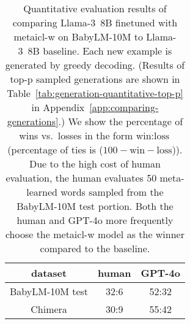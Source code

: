 \documentclass{article}
\begin{document}
\begin{table}[h]
\small
\begin{center}
\end{center}
\caption{Percentages of wins of each model when comparing the generations from \mbox{Llama-3 8B} baseline (pre-trained to instruction-tuned) with the \ac{metaicl-w} model finetuned from that baseline, judged by \mbox{GPT-4o}.
The left two datasets are for new usage example generation in Section~\ref{sec:example-generation}, and the right-most one is for definition generation in Section~\ref{sec:definition-generation}.
Each new example or definition is generated by top-p=$0.92$.
The percentage of ties is the remaining after subtracting the win percentages of the two models.
\mbox{GPT-4o} more frequently chooses the \ac{metaicl-w} model as the winner compared to the corresponding baseline, except for the instruction-tuned model on Chimera and CoLLEGe-DefGen.}
\label{tab:generative-quantitative-compare-top-p}
\end{table}


\iffalse

\begin{table}[t]
\small
\begin{center}
\begin{tabular}{c|cc}
\toprule
dataset         & human & GPT-4o \\
\midrule
BabyLM-10M test & 32:6  & 52:32 \\
Chimera         & 30:9  & 55:42 \\
\bottomrule
\end{tabular}
\end{center}
\caption{Quantitative evaluation results of comparing \mbox{Llama-3 8B} finetuned with \ac{metaicl-w} on BabyLM-10M to \mbox{Llama-3 8B} baseline. Each new example is generated by greedy decoding.
(Results of top-p sampled generations are shown in Table~\ref{tab:generation-quantitative-top-p} in Appendix~\ref{app:comparing-generations}.)
We show the percentage of wins vs.\ losses in the form $\text{win}:\text{loss}$ (percentage of ties is ($100-\text{win}-\text{loss}$)).
Due to the high cost of human evaluation, the human evaluates 50 meta-learned words sampled from the BabyLM-10M test portion.
Both the human and \mbox{GPT-4o} more frequently choose the \ac{metaicl-w} model as the winner compared to the baseline.}
\label{tab:generation-quantitative-greedy}
\end{table}
\end{document}
